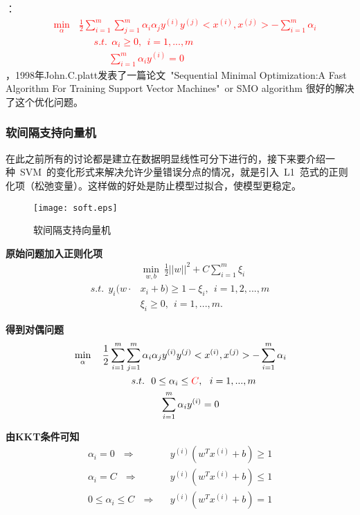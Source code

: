 ：
\textcolor{red}{\begin{align}
            &\min \limits_\alpha ~~~\frac{1}{2}\sum_{i=1}^{m}\sum_{j=1}^{m}\alpha_i\alpha_jy^{(i)}y^{(j)}<x^{(i)},x^{(j)}>-\sum_{i=1}^{m}\alpha_i \nonumber\nonumber\\
         &~~~~~~~~~~~~~~~~~~~~s.t.~~\alpha_i\geq 0,~~i=1,...,m \nonumber \\
               &~~~~~~~~~~~~~~~~~~~~~~~~~~~\sum_{i=1}^{m}\alpha_iy^{(i)}=0 \nonumber
\end{align}}
，1998年John.C.platt发表了一篇论文~"Sequential Minimal Optimization:A Fast Algorithm For Training Support Vector Machines"~or SMO algorithm 很好的解决了这个优化问题。


\subsubsection{软间隔支持向量机}
在此之前所有的讨论都是建立在数据明显线性可分下进行的，接下来要介绍一种~SVM~的变化形式来解决允许少量错误分点的情况，就是引入~L1~范式的正则化项（松弛变量）。这样做的好处是防止模型过拟合，使模型更稳定。
\begin{figure}[!htb]
  \centering
  \texttt{[image: soft.eps]}
  \caption{软间隔支持向量机}
\end{figure}

\textbf{原始问题加入正则化项} ~~
\begin{align}
            &\min \limits_{w,b} ~\frac{1}{2}||w||^2 + C\sum_{i=1}^{m}\xi_i  \nonumber  \\
    s.t.~~  y_i(w\cdot& x_i+b) \geq 1-\xi_i,~~i=1,2,...,m\nonumber\\
            ~~~&\xi_i\geq 0,~~i=1,...,m. \nonumber
\end{align}

\textbf{得到对偶问题} ~~
\begin{align}
            &\min \limits_\alpha ~~~\frac{1}{2}\sum_{i=1}^{m}\sum_{j=1}^{m}\alpha_i\alpha_jy^{(i)}y^{(j)}<x^{(i)},x^{(j)}>-\sum_{i=1}^{m}\alpha_i \nonumber\nonumber\\
         &~~~~~~~~~~~~~~~~~~s.t.~~0 \leq\alpha_i\leq \textcolor{red}{C},~~i=1,...,m \nonumber \\
               &~~~~~~~~~~~~~~~~~~~~~~~~~~~\sum_{i=1}^{m}\alpha_iy^{(i)}=0 \nonumber
\end{align}

\textbf{由KKT条件可知}
\begin{align}
    \alpha_i=0 ~~~ \Rightarrow  &~~~y^{(i)}(w^Tx^{(i)}+b)\geq1   \nonumber\\
    \alpha_i=C ~~~ \Rightarrow &~~~y^{(i)}(w^Tx^{(i)}+b)\leq1   \nonumber\\
    0\leq\alpha_i\leq C ~~~ \Rightarrow &~~~y^{(i)}(w^Tx^{(i)}+b)=1   \nonumber
\end{align}

